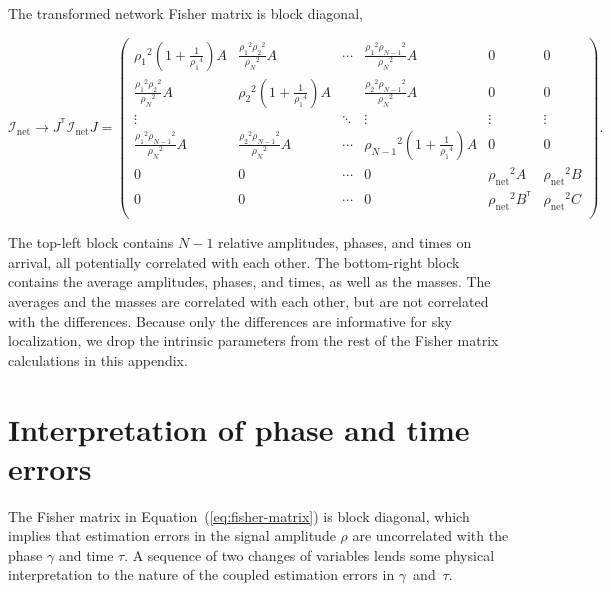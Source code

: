 \documentclass[amsmath,amssymb,aps,prx,reprint,nopreprintnumbers,nofootinbib]{revtex4-1}
\newcommand\transpose{\ensuremath{^{^\mathsf{T}}}}
\begin{document}
%
The transformed network Fisher matrix is block diagonal,
%
\begin{widetext}
\begin{equation}
    \mathcal{I}_\mathrm{net} \rightarrow J\transpose \mathcal{I}_\mathrm{net} J = \left(
    \begin{array}{cccccc}
    {\rho_1}^2(1+\frac{1}{{\rho_1}^4}) A & \frac{{\rho_1}^2 {\rho_2}^2}{{\rho_N}^2} A & \cdots & \frac{{\rho_1}^2 {\rho_{N-1}}^2}{{\rho_N}^2} A & 0 & 0 \\
    \frac{{\rho_1}^2 {\rho_2}^2}{{\rho_N}^2} A & {\rho_2}^2(1+\frac{1}{{\rho_1}^4}) A & & \frac{{\rho_2}^2 {\rho_{N-1}}^2}{{\rho_N}^2} A & 0 & 0 \\
    \vdots & & \ddots & \vdots & \vdots & \vdots \\
    \frac{{\rho_1}^2 {\rho_{N-1}}^2}{{\rho_N}^2} A & \frac{{\rho_2}^2 {\rho_{N-1}}^2}{{\rho_N}^2} A & \cdots & {\rho_{N-1}}^2(1+\frac{1}{{\rho_1}^4}) A & 0 & 0 \\
    0 & 0 & \cdots & 0 & {\rho_\mathrm{net}}^2 A & {\rho_\mathrm{net}}^2 B \\
    0 & 0 & \cdots & 0 & {\rho_\mathrm{net}}^2 B\transpose & {\rho_\mathrm{net}}^2 C \\
    \end{array}
    \right).
\end{equation}
\end{widetext}
%
The top\nobreakdashes-left block contains $N-1$ relative amplitudes, phases, and times on arrival, all potentially correlated with each other. The bottom\nobreakdashes-right block contains the average amplitudes, phases, and times, as well as the masses. The averages and the masses are correlated with each other, but are not correlated with the differences. Because only the differences are informative for sky localization, we drop the intrinsic parameters from the rest of the Fisher matrix calculations in this appendix.

\section{Interpretation of phase and time errors}
\label{sec:interpretation-of-errors}

The Fisher matrix in Equation~(\ref{eq:fisher-matrix}) is block diagonal, which implies that estimation errors in the signal amplitude $\rho$ are uncorrelated with the phase $\gamma$ and time $\tau$. A sequence of two changes of variables lends some physical interpretation to the nature of the coupled estimation errors in $\gamma$~and~$\tau$.
\end{document}

